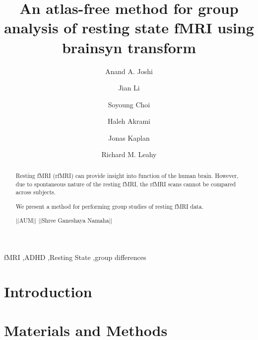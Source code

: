 \documentclass[preprint,12pt]{elsarticle}
\begin{document}
\begin{frontmatter}
\title{An atlas-free method for group analysis of resting state fMRI using brainsyn transform}




\author[usc]{Anand A. Joshi}
\author[usc]{Jian Li}
\author[usc]{Soyoung Choi}
\author[usc]{Haleh Akrami}
\author[usc]{Jonas Kaplan}
\author[usc]{Richard M. Leahy}

\address[usc]{University of Southern California, Los Angeles, USA}

\begin{abstract}
Resting fMRI (rfMRI) can provide insight into function of the human brain. However, due to spontaneous nature of the resting fMRI, the rfMRI scans cannot be compared across subjects.

We present a method for performing group studies of resting fMRI data.

||AUM||
||Shree Ganeshaya Namaha||

\end{abstract}

\begin{keyword}
fMRI \sep ADHD \sep Resting State \sep group differences
\end{keyword}

\end{frontmatter}
\linenumbers


\section{Introduction}
\label{sec:introduction}



\section{Materials and Methods}
\label{sec:mat_methods}
\end{document}
